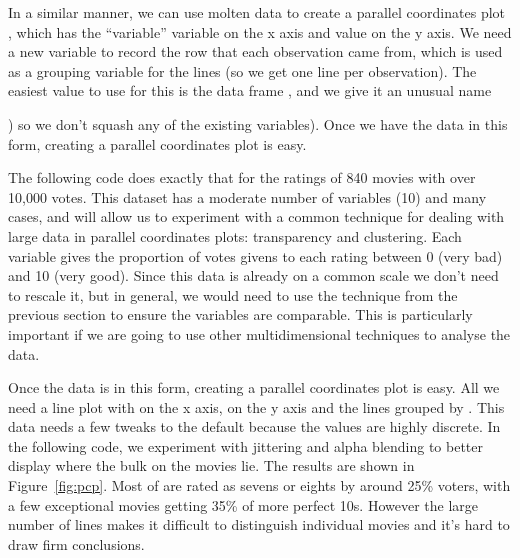 In a similar manner, we can use molten data to create a parallel coordinates plot \citep{inselberg:1985,wegman:1990}, which has the ``variable'' variable on the x axis and value on the y axis.  We need a new variable to record the row that each observation came from, which is used as a grouping variable for the lines (so we get one line per observation). The easiest value to use for this is the data frame , and we give it an unusual name {) so we don't squash any of the existing variables). Once we have the data in this form, creating a parallel coordinates plot is easy.

The following code does exactly that for the ratings of 840 movies with over 10,000 votes. This dataset has a moderate number of variables (10) and many cases, and will allow us to experiment with a common technique for dealing with large data in parallel coordinates plots: transparency and clustering. Each variable gives the proportion of votes givens to each rating between 0 (very bad) and 10 (very good). Since this data is already on a common scale we don't need to rescale it, but in general, we would need to use the technique from the previous section to ensure the variables are comparable. This is particularly important if we are going to use other multidimensional techniques to analyse the data.

% 


Once the data is in this form, creating a parallel coordinates plot is easy. All we need a line plot with  on the x axis,  on the y axis and the lines grouped by . This data needs a few tweaks to the default because the values are highly discrete. In the following code, we experiment with jittering and alpha blending to better display where the bulk on the movies lie. The results are shown in Figure~\ref{fig:pcp}. Most of are rated as sevens or eights by around 25\% voters, with a few exceptional movies getting 35\% of more perfect 10s. However the large number of lines makes it difficult to distinguish individual movies and it's hard to draw firm conclusions.

%


}
